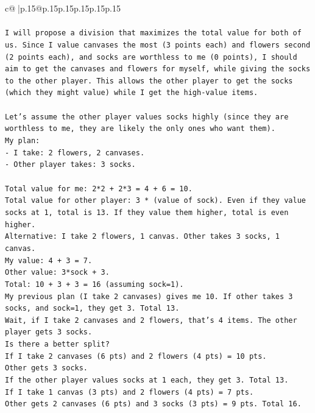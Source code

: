 \documentclass{article}
\begin{document}
{\begin{supertabular}{c@{$\;$}|p{.15\linewidth}@{}p{.15\linewidth}p{.15\linewidth}p{.15\linewidth}p{.15\linewidth}p{.15\linewidth}}
{{{\\ 
\\ 
\texttt{I will propose a division that maximizes the total value for both of us. Since I value canvases the most (3 points each) and flowers second (2 points each), and socks are worthless to me (0 points), I should aim to get the canvases and flowers for myself, while giving the socks to the other player. This allows the other player to get the socks (which they might value) while I get the high{-}value items.} \\
\\ 
\texttt{Let's assume the other player values socks highly (since they are worthless to me, they are likely the only ones who want them).} \\
\texttt{My plan:} \\
\texttt{{-} I take: 2 flowers, 2 canvases.} \\
\texttt{{-} Other player takes: 3 socks.} \\
\\ 
\texttt{Total value for me: 2*2 + 2*3 = 4 + 6 = 10.} \\
\texttt{Total value for other player: 3 * (value of sock). Even if they value socks at 1, total is 13. If they value them higher, total is even higher.} \\
\texttt{Alternative: I take 2 flowers, 1 canvas. Other takes 3 socks, 1 canvas.} \\
\texttt{My value: 4 + 3 = 7.} \\
\texttt{Other value: 3*sock + 3.} \\
\texttt{Total: 10 + 3 + 3 = 16 (assuming sock=1).} \\
\texttt{My previous plan (I take 2 canvases) gives me 10. If other takes 3 socks, and sock=1, they get 3. Total 13.} \\
\texttt{Wait, if I take 2 canvases and 2 flowers, that's 4 items. The other player gets 3 socks.} \\
\texttt{Is there a better split?} \\
\texttt{If I take 2 canvases (6 pts) and 2 flowers (4 pts) = 10 pts.} \\
\texttt{Other gets 3 socks.} \\
\texttt{If the other player values socks at 1 each, they get 3. Total 13.} \\
\texttt{If I take 1 canvas (3 pts) and 2 flowers (4 pts) = 7 pts.} \\
\texttt{Other gets 2 canvases (6 pts) and 3 socks (3 pts) = 9 pts. Total 16.} \\
}}}
\end{supertabular}}
\end{document}
